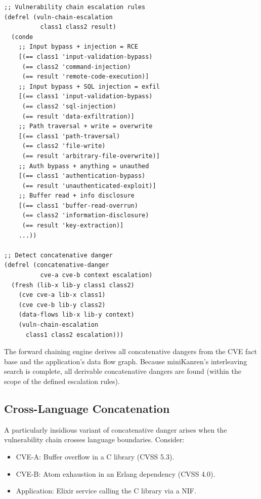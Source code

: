 \documentclass[11pt,twocolumn]{article}
\begin{document}
\begin{lstlisting}[language=miniKanren,caption={Concatenative danger rules},label=lst:kanren-concat]
;; Vulnerability chain escalation rules
(defrel (vuln-chain-escalation
          class1 class2 result)
  (conde
    ;; Input bypass + injection = RCE
    [(== class1 'input-validation-bypass)
     (== class2 'command-injection)
     (== result 'remote-code-execution)]
    ;; Input bypass + SQL injection = exfil
    [(== class1 'input-validation-bypass)
     (== class2 'sql-injection)
     (== result 'data-exfiltration)]
    ;; Path traversal + write = overwrite
    [(== class1 'path-traversal)
     (== class2 'file-write)
     (== result 'arbitrary-file-overwrite)]
    ;; Auth bypass + anything = unauthed
    [(== class1 'authentication-bypass)
     (== result 'unauthenticated-exploit)]
    ;; Buffer read + info disclosure
    [(== class1 'buffer-read-overrun)
     (== class2 'information-disclosure)
     (== result 'key-extraction)]
    ...))

;; Detect concatenative danger
(defrel (concatenative-danger
          cve-a cve-b context escalation)
  (fresh (lib-x lib-y class1 class2)
    (cve cve-a lib-x class1)
    (cve cve-b lib-y class2)
    (data-flows lib-x lib-y context)
    (vuln-chain-escalation
      class1 class2 escalation)))
\end{lstlisting}

The forward chaining engine derives all concatenative dangers from
the CVE fact base and the application's data flow graph. Because
miniKanren's interleaving search is complete, all derivable
concatenative dangers are found (within the scope of the defined
escalation rules).

\subsection{Cross-Language Concatenation}

A particularly insidious variant of concatenative danger arises when
the vulnerability chain crosses language boundaries. Consider:

\begin{itemize}[nosep]
  \item CVE-A: Buffer overflow in a C library (CVSS 5.3).
  \item CVE-B: Atom exhaustion in an Erlang dependency (CVSS 4.0).
  \item Application: Elixir service calling the C library via a NIF.
\end{itemize}
\end{document}
